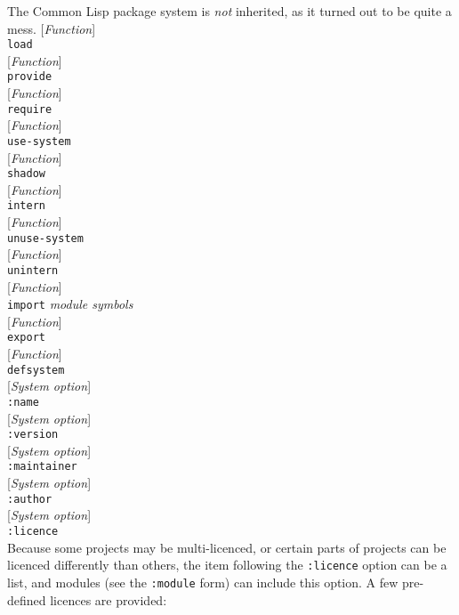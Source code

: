 \documentclass[10pt]{book}
\newenvironment{defother}[2]{[\textit{#1}]\\\texttt{#2}}{\\}
\newenvironment{defun}[1]{\begin{defother}{Function}{#1}}{\end{defother}}
\begin{document}
The Common Lisp package system is \textit{not} inherited, as it turned out to be quite a mess.
\begin{defun}{load}\end{defun}
\begin{defun}{provide}\end{defun} %
\begin{defun}{require}\end{defun}
\begin{defun}{use-system}\end{defun}
\begin{defun}{shadow}\end{defun}
\begin{defun}{intern}\end{defun}
\begin{defun}{unuse-system}\end{defun}
\begin{defun}{unintern}\end{defun}
\begin{defun}{import} \textit{module symbols}\end{defun}
\begin{defun}{export}\end{defun}
\begin{defun}{defsystem}\end{defun} %
\begin{defother}{System option}{:name}\end{defother}
\begin{defother}{System option}{:version}\end{defother}
\begin{defother}{System option}{:maintainer}\end{defother}
\begin{defother}{System option}{:author}\end{defother}
\begin{defother}{System option}{:licence}\end{defother} %
Because some projects may be multi-licenced, or certain parts of projects can be licenced differently than others, the item following the \texttt{:licence} option can be a list, and modules (see the \texttt{:module} form) can include this option. A few pre-defined licences are provided:\\
\end{document}
